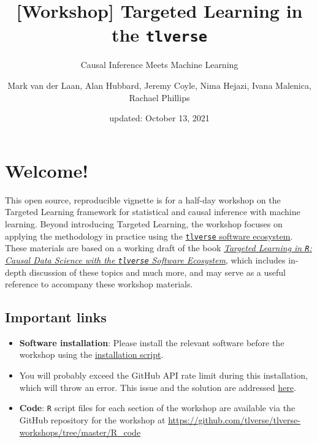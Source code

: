 \documentclass[
  12pt, krantz2,
]{book}
\title{{[}Workshop{]} Targeted Learning in the \passthrough{\lstinline!tlverse!}}
\subtitle{Causal Inference Meets Machine Learning}
\author{Mark van der Laan, Alan Hubbard, Jeremy Coyle, Nima Hejazi, Ivana Malenica, Rachael Phillips}
\date{updated: October 13, 2021}
\newcommand{\passthrough}[1]{#1}
\theoremstyle{definition}
\theoremstyle{definition}
\theoremstyle{definition}
\newcommand{\1}{\mathbbm{1}}
\begin{document}
\maketitle


\thispagestyle{empty}

\begin{center}
\end{center}

\setlength{\abovedisplayskip}{-5pt}
\setlength{\abovedisplayshortskip}{-5pt}

\mainmatter

{
\hypersetup{linkcolor=}
\setcounter{tocdepth}{2}
\tableofcontents
}
\listoftables
\listoffigures
\hypertarget{welcome}{%
\chapter*{Welcome!}\label{welcome}}


This open source, reproducible vignette is for a half-day workshop on the
Targeted Learning framework for statistical and causal inference with machine
learning. Beyond introducing Targeted Learning, the workshop focuses on
applying the methodology in practice using the \href{https://github.com/tlverse}{\passthrough{\lstinline!tlverse!} software
ecosystem}. These materials are based on a working
draft of the book \href{https://tlverse.org/tlverse-handbook/}{\emph{Targeted Learning in \passthrough{\lstinline!R!}: Causal Data Science with the
\passthrough{\lstinline!tlverse!} Software Ecosystem}}, which
includes in-depth discussion of these topics and much more, and may serve as a
useful reference to accompany these workshop materials.

\hypertarget{important-links}{%
\section*{Important links}\label{important-links}}


\begin{itemize}
\item
  \textbf{Software installation}: Please install the relevant software before the
  workshop using the \href{https://github.com/tlverse/tlverse-workshops/blob/master/install.R}{installation
  script}.
\item
  You will probably exceed the GitHub API rate limit during this installation,
  which will throw an error. This issue and the solution are addressed
  \protect\hyperlink{installtlverse}{here}.
\item
  \textbf{Code}: \passthrough{\lstinline!R!} script files for each section of the workshop are available via
  the GitHub repository for the workshop at
  \url{https://github.com/tlverse/tlverse-workshops/tree/master/R_code}
\end{itemize}
\end{document}
